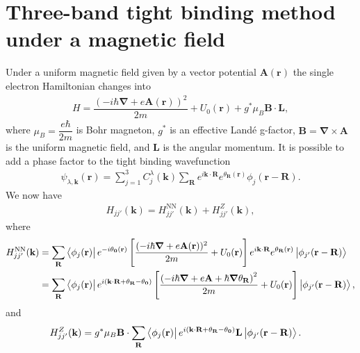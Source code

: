 \documentclass{report}
\newcommand{\f}[2]{\dfrac{#1}{#2}}
\begin{document}
\section{Three-band tight binding method under a magnetic field}\label{Section 2.2}
Under a uniform magnetic field given by a vector potential $\mathbf{A}(\mathbf{r})$ the single electron Hamiltonian changes into
\begin{gather}
	H = \f{\left(-i\hbar \boldsymbol{\nabla} + e \mathbf{A(r)}\right)^{2}}{2m} + U_{0}(\mathbf{r}) + g^{*} \mu_{B} \mathbf{B} \cdot \mathbf{L},
\end{gather}
where $\mu_{B} = \f{e\hbar}{2m}$ is Bohr magneton, $g^{*}$ is an effective Landé g-factor, $\mathbf{B} = \boldsymbol{\nabla} \times  \mathbf{A}$ is the uniform magnetic field, and $\mathbf{L}$ is the angular momentum. It is possible to add a phase factor to the tight binding wavefunction
\begin{align}
	\psi_{\lambda,\mathbf{k}} (\mathbf{r}) = \sum_{j=1}^{3} C_{j}^{\lambda}(\mathbf{k}) \sum_{\mathbf{R}} e^{i\mathbf{k \cdot R}} e^{ \theta_{\mathbf{R}}(\mathbf{r})} \phi_{j}(\mathbf{r} - \mathbf{R}).
\end{align}
We now have
\begin{align}
	H_{j j'} (\mathbf{k}) = H_{jj'}^{\text{NN}}(\mathbf{k}) + H_{jj'}^{Z}(\mathbf{k}),
\end{align}
where
\begin{equation}
	\begin{aligned}
		H_{jj'}^{\text{NN}}(\mathbf{k})
		 & = \sum_{\mathbf{R}} \bra{\phi_{j}(\mathbf{r})} e^{-i \theta_{\mathbf{0}}(\mathbf{r})} \left[\f{(-i\hbar \boldsymbol{\nabla} + e \mathbf{A}(\mathbf{r}))^{2}}{2m} + U_{0}(\mathbf{r}) \right] e^{i\mathbf{k \cdot R}} e^{ \theta_{\mathbf{R}}(\mathbf{r})} \ket{\phi_{j'}(\mathbf{r - R})}                        \\
		 & = \sum_{\mathbf{R}} \bra{\phi_{j}(\mathbf{r})} e^{i(\mathbf{k \cdot R} +\theta_{\mathbf{R}} - \theta_{\mathbf{0}} )} \left[ \f{ \left( -i\hbar \boldsymbol{\nabla} + e \mathbf{A} + \hbar \boldsymbol{\nabla} \theta_{\mathbf{R}} \right)^{2} }{2m} + U_{0}(\mathbf{r}) \right] \ket{\phi_{j'}(\mathbf{r - R})},
	\end{aligned}
\end{equation}
and
\begin{align}
	H_{jj'}^{Z}(\mathbf{k})
	 & = g^{*} \mu_{B} \mathbf{B} \cdot \sum_{\mathbf{R}} \bra{\phi_{j}(\mathbf{r})} e^{i(\mathbf{k \cdot R} + \theta_{\mathbf{R}} - \theta_{\mathbf{0}} )} \mathbf{L} \ket{\phi_{j'}(\mathbf{r - R})}.
\end{align}
\end{document}
